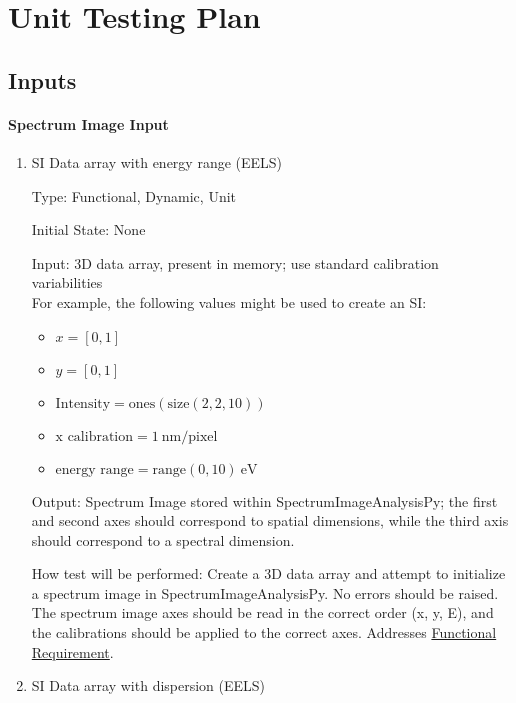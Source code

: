 \documentclass[12pt, titlepage]{article}
\newcommand{\progname}{SpectrumImageAnalysisPy}
\begin{document}
				
\section{Unit Testing Plan}
\label{sec:UnitTest}

\subsection{Inputs}
		
\paragraph{Spectrum Image Input}

\begin{enumerate}

\item{SI Data array with energy range (EELS)}

Type: Functional, Dynamic, Unit

Initial State: None

Input: 3D data array, present in memory; use standard calibration variabilities\\
For example, the following values might be used to create an SI: 
\begin{itemize}
	\item $x = [0, 1]$
	\item $y = [0, 1]$
	\item $\text{Intensity} = \text{ones}(\text{size}(2,2,10))$
	\item $\text{x calibration} = 1\ \si{\nano\metre}/\text{pixel}$
	\item $\text{energy range} = \text{range}(0, 10)\ \si{\electronvolt}$
\end{itemize}

Output: Spectrum Image stored within \progname{}; the first and second axes should correspond to spatial dimensions, while the third axis should correspond to a spectral dimension.

How test will be performed: Create a 3D data array and attempt to initialize a spectrum image in \progname{}. No errors should be raised. The spectrum image axes should be read in the correct order (x, y, E), and the calibrations should be applied to the correct axes. Addresses \hyperref[R_SI_inputs]{Functional Requirement}.


\item{SI Data array with dispersion (EELS)}


\end{enumerate}
\end{document}
